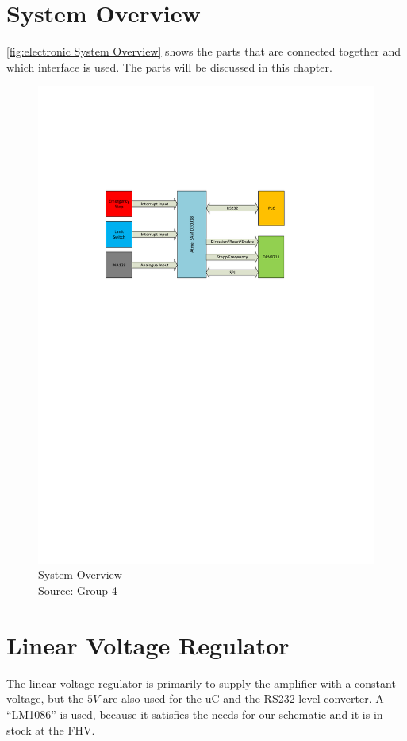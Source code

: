 \documentclass[a4paper,12pt]{scrreprt}
\begin{document}
\section{System Overview}
\autoref{fig:electronic System Overview} shows the parts that are connected together and which interface is used. The parts will be discussed in this chapter.
 \begin{figure}[H]
  \centering
   \includegraphics[width=1\textwidth]{pictures/Electronic_overview.pdf}
   \caption[System Overview]{System Overview\\
	Source: Group 4}
     \label{fig:electronic System Overview}
\end{figure}

\section{Linear Voltage Regulator}
The linear voltage regulator is primarily to supply the amplifier with a constant voltage, but the $5V$ are also used for the \acs{uC} and the \acs{RS232} level converter. A \enquote{LM1086} is used, because it satisfies the needs for our schematic and it is in stock at the FHV.
\end{document}
